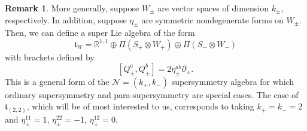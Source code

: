 \documentclass{article}
\newcommand{\RR}{\mathbb{R}}
\newcommand{\cN}{\mathcal{N}}
\theoremstyle{definition}
\newtheorem{remark}[theorem]{Remark}
\theoremstyle{remark}
\begin{document}
\begin{remark}

More generally, suppose $W_\pm$ are vector spaces of dimension $k_\pm$, respectively.
In addition, suppose $\eta_\pm$ are symmetric nondegenerate forms on $W_\pm$. 
Then, we can define a super Lie algebra of the form
\[
\mathfrak{t}_{W} =  \RR^{1,1} \oplus \Pi(S_+ \otimes W_+) \oplus \Pi(S_- \otimes W_-)
\]
with brackets defined by
\[
[Q_\pm^{a}, Q_\pm^{b}] = 2 \eta^{ab}_\pm \partial_\pm .
\] 
This is a general form of the $\cN = (k_+, k_-)$ supersymmetry algebra for which ordinary supersymmetry and para-supersymmetry are special cases.
The case of $\mathfrak{t}_{(2,2)}$, which will be of most interested to us, corresponds to taking $k_+ = k_- = 2$ and $\eta_\pm^{11} = 1$, $\eta^{22}_\pm = - 1$, $\eta^{12}_{\pm} = 0$. 

\end{remark}
\end{document}
